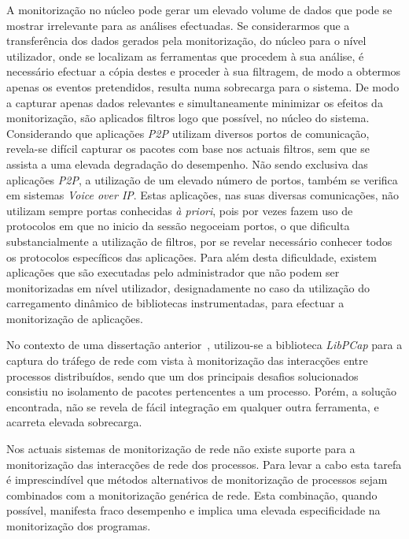 A monitorização no núcleo pode gerar um elevado volume de dados que pode se mostrar irrelevante para as análises efectuadas.
Se considerarmos que a transferência dos dados gerados pela monitorização, do núcleo para o nível utilizador, onde se localizam as ferramentas que procedem à sua análise, é necessário efectuar a cópia destes e proceder à sua filtragem, de modo a obtermos apenas os eventos pretendidos, resulta numa sobrecarga para o sistema.
De modo a capturar apenas dados relevantes e simultaneamente minimizar os efeitos da monitorização, são aplicados filtros logo que possível, no núcleo do sistema.
Considerando que aplicações \textit{P2P} utilizam diversos portos de comunicação, revela-se difícil capturar os pacotes com base nos actuais filtros, sem que se assista a uma elevada degradação do desempenho.
Não sendo exclusiva das aplicações \textit{P2P}, a utilização de um elevado número de portos, também se verifica em sistemas \textit{Voice over IP}.
Estas aplicações, nas suas diversas comunicações, não utilizam sempre portas conhecidas \textit{à priori}, pois por vezes fazem uso de protocolos em que no inicio da sessão negoceiam portos, o que dificulta substancialmente a utilização de filtros, por se revelar necessário conhecer todos os protocolos específicos das aplicações.
Para além desta dificuldade, existem aplicações que são executadas pelo administrador que não podem ser monitorizadas em nível utilizador, designadamente no caso da utilização do carregamento dinâmico de bibliotecas instrumentadas, para efectuar a monitorização de aplicações.

No contexto de uma dissertação anterior~\cite{Farruca:2009}, utilizou-se a biblioteca \textit{LibPCap} para a captura do tráfego de rede com vista à monitorização das interacções entre processos distribuídos, sendo que um dos principais desafios solucionados consistiu no isolamento de pacotes pertencentes a um processo.
Porém, a solução encontrada, não se revela de fácil integração em qualquer outra ferramenta, e acarreta elevada sobrecarga.

Nos actuais sistemas de monitorização de rede não existe suporte para a monitorização das interacções de rede dos processos.
Para levar a cabo esta tarefa é imprescindível que métodos alternativos de monitorização de processos sejam combinados com a monitorização genérica de rede.
Esta combinação, quando possível, manifesta fraco desempenho e implica uma elevada especificidade na monitorização dos programas.



